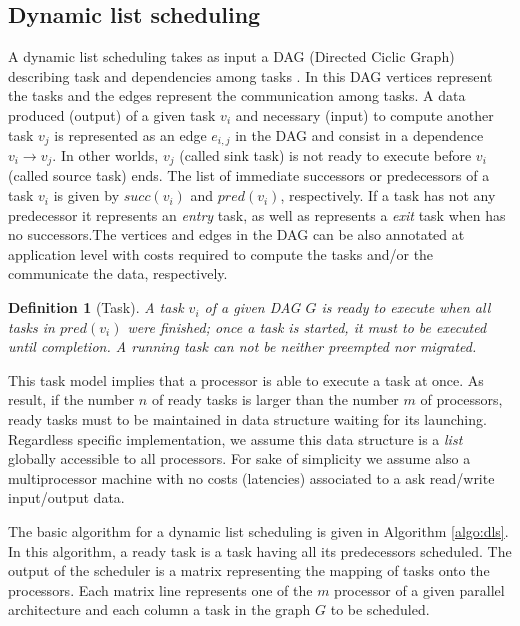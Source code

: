 \documentclass{sig-alternate}
\newtheorem{definition}[thm]{Definition}
\begin{document}
\subsection{Dynamic list scheduling}\label{ssec:dls}

A dynamic list scheduling takes as input a DAG (Directed Ciclic Graph)
describing task and dependencies among tasks \cite{Graham66}. In this
DAG vertices represent the tasks and the edges represent the
communication among tasks. A data produced (output) of a given task
$v_i$ and necessary (input) to compute another task $v_j$ is
represented as an edge $e_{i,j}$ in the DAG and consist in a
dependence $v_i{\rightarrow}v_j$. In other worlds, $v_j$ (called sink
task) is not ready to execute before $v_i$ (called source task) ends.
The list of immediate successors or predecessors of a task $v_i$ is
given by $succ(v_i)$ and $pred(v_i)$, respectively. If a task has not
any predecessor it represents an {\em entry} task, as well as
represents a {\em exit} task when has no successors.The vertices and
edges in the DAG can be also annotated at application level with costs
required to compute the tasks and/or the communicate the data,
respectively.

\begin{definition}[Task]
A task $v_i$ of a given DAG $G$ is ready to execute when all tasks in
$pred(v_i)$ were finished; once a task is started, it must to be
executed until completion. A running task can not be neither preempted
nor migrated.
\end{definition}

This task model implies that a processor is able to execute a task at
once. As result, if the number $n$ of ready tasks is larger than the
number $m$ of processors, ready tasks must to be maintained in data
structure waiting for its launching. Regardless specific
implementation, we assume this data structure is a {\em list} globally
accessible to all processors. For sake of simplicity we assume also a
multiprocessor machine with no costs (latencies) associated to a ask
read/write input/output data.

The basic algorithm for a dynamic list scheduling is given in
Algorithm \ref{algo:dls}. In this algorithm, a ready task is a task
having all its predecessors scheduled. The output of the scheduler is
a matrix representing the mapping of tasks onto the processors. Each
matrix line represents one of the $m$ processor of a given parallel
architecture and each column a task in the graph $G$ to be scheduled.
\end{document}
